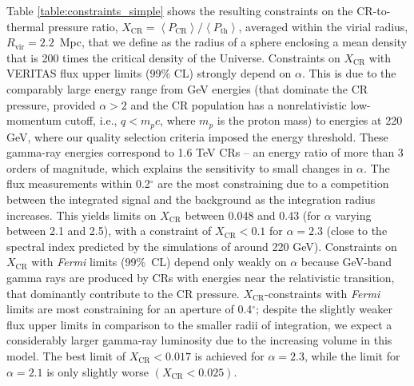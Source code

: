 \documentclass[12pt,manuscript]{aastex}
\def\Fermi{{\em Fermi}\xspace}
\newcommand{\expval}[1]{\left\langle #1 \right\rangle}
\newcommand{\rmn}{\mathrm}
\newcommand{\CR}{\mathrm{CR}}
\begin{document}
Table \ref{table:constraints_simple} shows the resulting constraints on the CR-to-thermal
pressure ratio, $X_{\CR} = \expval{P_{\CR}}/\expval{P_\rmn{th}}$, averaged within the virial radius,
$R_\rmn{vir}=2.2$~Mpc, that we define as the radius of a sphere enclosing a mean density that is 200
times the critical density of the Universe. Constraints on $X_\CR$ with 
VERITAS flux upper limits (99\% CL) strongly depend on $\alpha$.
This is due to the comparably large energy range from GeV
energies (that dominate the CR pressure, provided $\alpha>2$ and the CR population has a
nonrelativistic low-momentum cutoff, i.e., $q<m_{p}c$, where $m_{p}$ is the proton mass) to energies
at 220 GeV, where our quality selection criteria imposed the energy threshold. These gamma-ray
energies correspond to 1.6 TeV CRs -- an energy ratio of more than 3 orders of magnitude, which
explains the sensitivity to small changes in $\alpha$. The flux measurements within 0.2$^{\circ}$
are the most constraining due to a competition between the integrated signal and the background as
the integration radius increases.  This yields limits on $X_\CR$ between 0.048 and 0.43 (for
$\alpha$ varying between 2.1 and 2.5), with a constraint of $X_\CR<0.1$ for $\alpha=2.3$ (close to
the spectral index predicted by the simulations of \citet{article:PinzkePfrommer:2010} around 220
GeV). Constraints on $X_\CR$ with \Fermi limits (99\%\ CL) depend only weakly on $\alpha$ because GeV-band gamma rays are produced by CRs with energies near the relativistic transition, that dominantly contribute to the CR pressure.
$X_\CR$-constraints with \Fermi limits are most constraining for an aperture of
0.4$^{\circ}$; despite the slightly weaker flux upper limits in comparison to the smaller radii of
integration, we expect a considerably larger gamma-ray luminosity due to the increasing volume in
this model. The best limit of $X_\CR< 0.017$ is achieved for $\alpha=2.3$, while the limit for
$\alpha=2.1$ is only slightly worse $(X_\CR<0.025)$.
\end{document}
